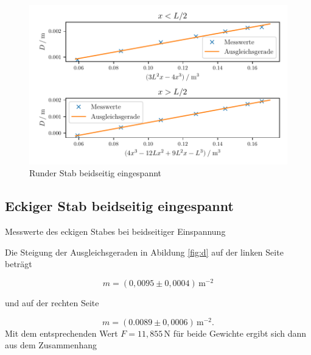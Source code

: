\begin{figure}[H]
  \centering
  \includegraphics{build/plot3.pdf}
  \caption{Runder Stab beidseitig eingespannt}
  \label{fig:c}
\end{figure}





\subsection{Eckiger Stab beidseitig eingespannt}


\begin{table}[H]
  \centering
  
  
  \caption{Messwerte des eckigen Stabes bei beidseitiger Einspannung}
  \label{tab:f}
\end{table}

Die Steigung der Ausgleichsgeraden in Abildung \ref{fig:d}
auf der linken Seite beträgt

\begin{equation*}
  m=(0,0095 \pm 0,0004)\,\si{\meter\tothe{-2}}
\end{equation*}

\noindent und auf der rechten Seite

\begin{equation*}
  m=(0.0089 \pm 0,0006)\,\si{\meter\tothe{-2}}.
\end{equation*}
\noindent Mit dem entsprechenden Wert $F=11,855 \, \si{\newton}$
für beide Gewichte ergibt sich dann aus dem Zusammenhang


